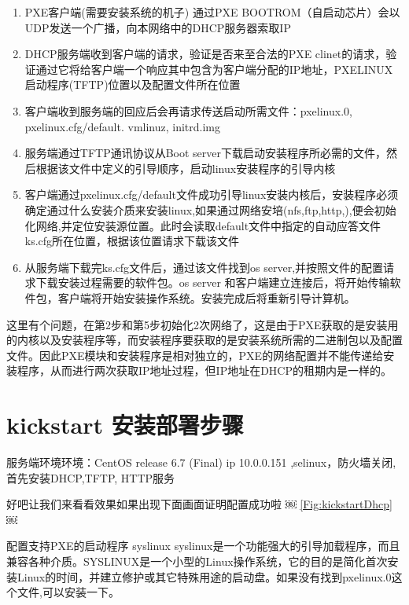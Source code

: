 \begin{enumerate}
\item PXE客户端(需要安装系统的机子) 通过PXE BOOTROM（自启动芯片）会以UDP发送一个广播，向本网络中的DHCP服务器索取IP
\item DHCP服务端收到客户端的请求，验证是否来至合法的PXE clinet的请求，验证通过它将给客户端一个响应其中包含为客户端分配的IP地址，PXELINUX启动程序(TFTP)位置以及配置文件所在位置
\item 客户端收到服务端的回应后会再请求传送启动所需文件：pxelinux.0, pxelinux.cfg/default. vmlinuz, initrd.img
\item 服务端通过TFTP通讯协议从Boot server下载启动安装程序所必需的文件，然后根据该文件中定义的引导顺序，启动linux安装程序的引导内核
\item 客户端通过pxelinux.cfg/default文件成功引导linux安装内核后，安装程序必须确定通过什么安装介质来安装linux,如果通过网络安培(nfs,ftp,http,),便会初始化网络,并定位安装源位置。此时会读取default文件中指定的自动应答文件ks.cfg所在位置，根据该位置请求下载该文件
\item 从服务端下载完ks.cfg文件后，通过该文件找到os server,并按照文件的配置请求下载安装过程需要的软件包。os server 和客户端建立连接后，将开始传输软件包，客户端将开始安装操作系统。安装完成后将重新引导计算机。
\end{enumerate}

这里有个问题，在第2步和第5步初始化2次网络了，这是由于PXE获取的是安装用的内核以及安装程序等，而安装程序要获取的是安装系统所需的二进制包以及配置文件。因此PXE模块和安装程序是相对独立的，PXE的网络配置并不能传递给安装程序，从而进行两次获取IP地址过程，但IP地址在DHCP的租期内是一样的。

\section{kickstart 安装部署步骤}
服务端环境环境：CentOS release 6.7 (Final)  ip 10.0.0.151 ,selinux，防火墙关闭, 首先安装DHCP,TFTP, HTTP服务



好吧让我们来看看效果如果出现下面画面证明配置成功啦
￼
\ref{Fig:kickstartDhcp}￼

配置支持PXE的启动程序 syslinux
syslinux是一个功能强大的引导加载程序，而且兼容各种介质。SYSLINUX是一个小型的Linux操作系统，它的目的是简化首次安装Linux的时间，并建立修护或其它特殊用途的启动盘。如果没有找到pxelinux.0这个文件,可以安装一下。



